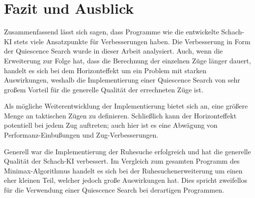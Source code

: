 
\chapter{Fazit und Ausblick}
Zusammenfassend lässt sich sagen, dass Programme wie die entwickelte Schach-KI stets viele Ansatzpunkte für Verbesserungen haben. Die Verbesserung in Form der Quiescence Search wurde in dieser Arbeit analysiert. Auch, wenn die Erweiterung zur Folge hat, dass die Berechnung der einzelnen Züge länger dauert, handelt es sich bei dem Horizonteffekt um ein Problem mit starken Auswirkungen, weshalb die Implementierung einer Quiescence Search von sehr großem Vorteil für die generelle Qualität der errechneten Züge ist.

Als mögliche Weiterentwicklung der Implementierung bietet sich an, eine größere Menge an taktischen Zügen zu definieren. Schließlich kann der Horizonteffekt potentiell bei jedem Zug auftreten; auch hier ist es eine Abwägung von Performanz-Einbußungen und Zug-Verbesserungen.

Generell war die Implementierung der Ruhesuche erfolgreich und hat die generelle Qualität der Schach-KI verbessert. Im Vergleich zum gesamten Programm des Minimax-Algorithmus handelt es sich bei der Ruhesuchenerweiterung um einen eher kleinen Teil, welcher jedoch große Auswirkungen hat. Dies spricht zweifellos für die Verwendung einer Quiescence Search bei derartigen Programmen.